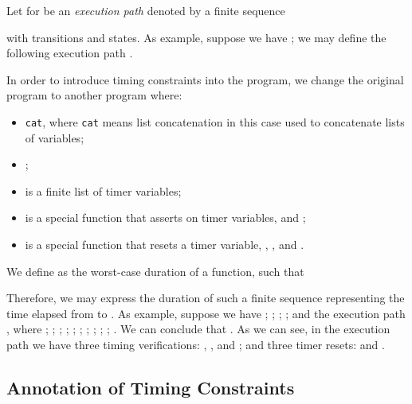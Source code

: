 \documentclass{llncs}
\begin{document}
Let  for  be an {\it execution path} denoted by a finite sequence 

with  transitions and  states. 
As example, suppose we have
;
we may define the following execution path
.


In order to introduce timing constraints into the program, we change the original 
program  to another program  
where:
\begin{itemize}
\item  {\tt cat}, where {\tt cat} means list concatenation
 in this case used to concatenate lists of variables;
\item ;
\item  is a finite list of timer variables;
\item  is a special function that asserts on timer variables,  and
 ;  
\item  is a special function that resets a timer variable, , , and .
\end{itemize}

We define  
as the worst-case duration of a function, such that


Therefore, we may express the duration  
of such a finite sequence 
representing the time elapsed from  to .
As example, suppose we have
;
;
 ;
;
and  the execution path
, where
;
;
;
;
;
;
;
;
;
;
.
We can conclude that
.
As we can see, in the execution path  we have three timing verifications: , , and ; and 
three timer resets:  and .



\subsection{Annotation of Timing Constraints}
\label{section:annotation}
\end{document}
